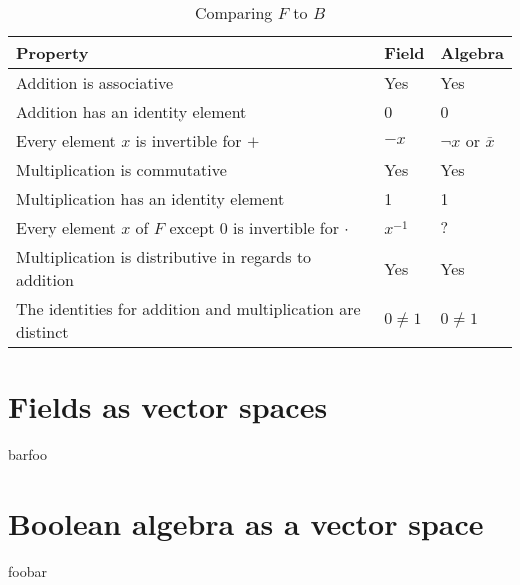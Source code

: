 \documentclass{article}
\begin{document}
\begin{table}[h]
	\centering
	\begin{tabular}{@{}lll@{}}
		\toprule
		Property                                                    & Field      & Algebra               \\ \toprule
		Addition is associative                                     & Yes        & Yes                   \\ \midrule
		Addition has an identity element                            & 0          & 0                     \\ \midrule
		Every element $x$ is invertible for $+$                     & $-x$       & $\neg x$ or $\bar{x}$ \\ \midrule
		Multiplication is commutative                               & Yes        & Yes                   \\ \midrule
		Multiplication has an identity element                      & 1          & 1                     \\ \midrule
		Every element $x$ of $F$ except 0 is invertible for $\cdot$ & $x^{-1}$   & $\text{?}$            \\ \midrule
		Multiplication is distributive in regards to addition       & Yes        & Yes                   \\ \midrule
		The identities for addition and multiplication are distinct & $0 \neq 1$ & $0 \neq 1$            \\ \bottomrule
	\end{tabular}
	\caption{Comparing $F$ to $B$}
\label{algebrafieldproof}
\end{table}

\section{Fields as vector spaces}
\label{sec:Fields as vector spaces}

barfoo

\section{Boolean algebra as a vector space}
\label{sec:Boolean algebra as a vector space}

foobar

\newpage



\end{document}
